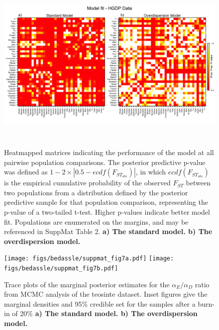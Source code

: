 \begin{figure}[ht!]
\begin{center}
  \includegraphics[width=6in,height=3.4in]{figs/bedassle/suppmat_fig6.png}
 \caption{
\textmd{Heatmapped matrices indicating the performance of the model at all pairwise population comparisons.  The posterior predictive p-value was defined as 
		$1-2 \times |0.5-ecdf(F_{ST_{obs}})|$, in which $ecdf(F_{ST_{obs}})$ is the empirical cumulative probability of the observed $F_{ST}$ between two populations from a distribution defined by the posterior predictive sample for that population comparison, representing the p-value of a two-tailed t-test.  Higher p-values indicate better model fit.  Populations are enumerated on the margins, and may be referenced in SuppMat Table 2.}
	\bf{a)}
 		\textmd{The standard model.}
	\bf{b)}
 		\textmd{The overdispersion model.}
\label{sfig:him.pps.pval}
  }
\end{center}
\end{figure}

\begin{figure}[ht!]
\begin{center}
  \texttt{[image: figs/bedassle/suppmat\_fig7a.pdf]}
  \texttt{[image: figs/bedassle/suppmat\_fig7b.pdf]}  
 \caption{
\textmd{Trace plots of the marginal posterior estimates for the $\alpha_{E} / \alpha_{D}$ ratio from MCMC analysis of the teosinte dataset.  Inset figures 
		give the marginal densities and 95\% credible set for the samples after a burn-in of 20\%}
	\bf{a)}
 		\textmd{The standard model.}
	\bf{b)}
 		\textmd{The overdispersion model.}
\label{sfig:zea_traceplot}
  }
\end{center}
\end{figure}


